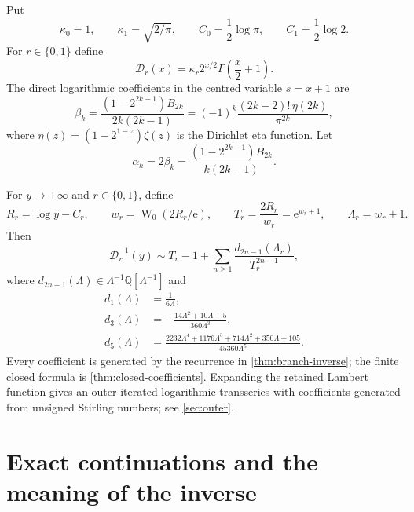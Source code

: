 \documentclass[11pt,a4paper,oneside]{article}
\theoremstyle{plain}
\theoremstyle{definition}
\theoremstyle{remark}
\newcommand{\e}{\mathrm e}
\newcommand{\Q}{\mathbb Q}
\newcommand{\W}{\operatorname W}
\newcommand{\D}{\mathcal D}
\newcommand{\etaD}{\eta}
\begin{document}
Put
\begin{equation}
 \kappa_0=1,\qquad \kappa_1=\sqrt{2/\pi},
 \qquad
 C_0=\frac12\log\pi,\qquad C_1=\frac12\log2.
 \label{eq:constants}
\end{equation}
For $r\in\{0,1\}$ define
\begin{equation}
 \D_r(x)=\kappa_r2^{x/2}\Gamma\!\left(\frac{x}{2}+1\right).
 \label{eq:Dr-def}
\end{equation}
The direct logarithmic coefficients in the centred variable $s=x+1$ are
\begin{equation}
 \beta_k=\frac{(1-2^{2k-1})B_{2k}}{2k(2k-1)}
 =(-1)^k\frac{(2k-2)!\,\etaD(2k)}{\pi^{2k}},
 \label{eq:beta-def}
\end{equation}
where $\etaD(z)=(1-2^{1-z})\zeta(z)$ is the Dirichlet eta function.  Let
\begin{equation}
 \alpha_k=2\beta_k
 =\frac{(1-2^{2k-1})B_{2k}}{k(2k-1)}.
 \label{eq:alpha-def}
\end{equation}

\begin{mainbox}
For $y\to+\infty$ and $r\in\{0,1\}$, define
\begin{equation}
 R_r=\log y-C_r,
 \qquad w_r=\W_0(2R_r/\e),
 \qquad T_r=\frac{2R_r}{w_r}=\e^{w_r+1},
 \qquad \Lambda_r=w_r+1.
 \label{eq:inverse-core-summary}
\end{equation}
Then
\begin{equation}
 \D_r^{-1}(y)
 \sim T_r-1+\sum_{n\ge1}
 \frac{d_{2n-1}(\Lambda_r)}{T_r^{2n-1}},
 \label{eq:inverse-main-summary}
\end{equation}
where $d_{2n-1}(\Lambda)\in
\Lambda^{-1}\Q[\Lambda^{-1}]$ and
\begin{align}
 d_1(\Lambda)&=\frac{1}{6\Lambda},
 \label{eq:d1-summary}\\
 d_3(\Lambda)&=-\frac{14\Lambda^2+10\Lambda+5}
 {360\Lambda^3},
 \label{eq:d3-summary}\\
 d_5(\Lambda)&=\frac{2232\Lambda^4+1176\Lambda^3+714\Lambda^2
 +350\Lambda+105}{45360\Lambda^5}.
 \label{eq:d5-summary}
\end{align}
Every coefficient is generated by the recurrence in
\cref{thm:branch-inverse}; the finite closed formula is
\cref{thm:closed-coefficients}.  Expanding the retained Lambert function gives
an outer iterated-logarithmic transseries with coefficients generated from
unsigned Stirling numbers; see \cref{sec:outer}.
\end{mainbox}

\section{Exact continuations and the meaning of the inverse}
\label{sec:continuations}
\end{document}
